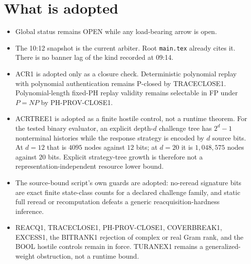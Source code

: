 \documentclass[11pt]{article}
\begin{document}
\section*{What is adopted}
\begin{itemize}
\item Global status remains OPEN while any load-bearing arrow is open.
\item The 10:12 snapshot is the current arbiter. Root \texttt{main.tex} already
cites it. There is no banner lag of the kind recorded at 09:14.
\item ACR1 is adopted only as a closure check. Deterministic polynomial replay
with polynomial authentication remains P-closed by TRACECLOSE1. Polynomial-length
fixed-PH replay validity remains selectable in FP under \(P=NP\) by
PH-PROV-CLOSE1.
\item ACRTREE1 is adopted as a finite hostile control, not a runtime theorem.
For the tested binary evaluator, an explicit depth-\(d\) challenge tree has
\(2^d-1\) nonterminal histories while the response strategy is encoded by \(d\)
source bits. At \(d=12\) that is \(4095\) nodes against \(12\) bits; at \(d=20\)
it is \(1{,}048{,}575\) nodes against \(20\) bits. Explicit strategy-tree growth
is therefore not a representation-independent resource lower bound.
\item The source-bound script's own guards are adopted: no-reread signature bits
are exact finite state-class counts for a declared challenge family, and static
full reread or recomputation defeats a generic reacquisition-hardness inference.
\item REACQ1, TRACECLOSE1, PH-PROV-CLOSE1, COVERBREAK1, EXCESS1, the BITRANK1
rejection of complex or real Gram rank, and the BOOL hostile controls remain in
force. TURANEX1 remains a generalized-weight obstruction, not a runtime bound.
\end{itemize}
\end{document}
